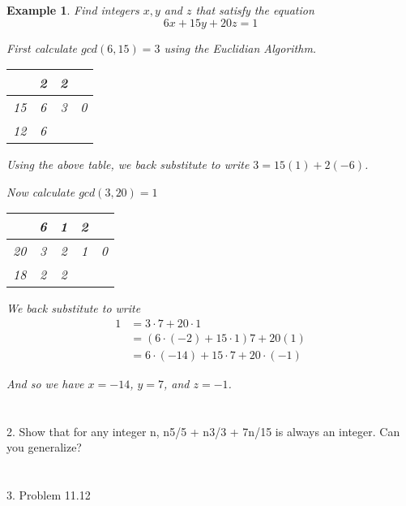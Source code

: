 \documentclass[letterpaper, 12pt, oneside]{memoir}
\theoremstyle{mystyle}
\newtheorem{example}[thm]{Example}
\begin{document}
\begin{example}
    Find integers $x, y$ and $z$ that satisfy the equation
    \[ 6x + 15y + 20z = 1\]
    
    First calculate $gcd(6,15) = 3$ using the Euclidian Algorithm.
    \begin{table}[H]
    \centering
    \begin{tabular}{c|c|c|c}
            & 2  & 2  &    \\ \hline
        15  & 6  & 3  & 0  \\ \hline
        12  & 6  &    &
    \end{tabular}
    \end{table}

    Using the above table, we back substitute to write $3 = 15(1) + 2(-6)$.
    
    Now calculate $gcd(3,20) = 1$
    \begin{table}[H]
    \centering 
    \begin{tabular}{c|c|c|c|c}
            & 6  & 1  & 2  &    \\ \hline
        20  & 3  & 2  & 1  & 0  \\ \hline
        18  & 2  & 2  &    &
    \end{tabular}
    \end{table}
    
    We back substitute to write 
    \begin{align*}
        1 &= 3 \cdot 7 + 20 \cdot 1 \\
          &= (6 \cdot (-2) + 15 \cdot 1)7 + 20(1) \\
          &= 6 \cdot (-14) + 15 \cdot 7 + 20 \cdot (-1)
    \end{align*}
    
    And so we have $x = -14$, $y = 7$, and $z=-1$.
    
\end{example}

\section{} 
2. Show that for any integer n, n5/5 + n3/3 + 7n/15 is always an integer. Can you generalize?

\section{} 
3. Problem 11.12
\end{document}
